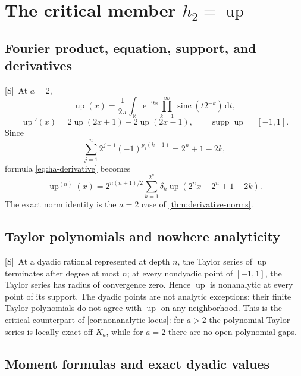 \documentclass[11pt,oneside]{article}
\theoremstyle{definition}
\theoremstyle{remark}
\newcommand{\R}{\mathbb R}
\newcommand{\Up}{\operatorname{up}}
\newcommand{\sinc}{\operatorname{sinc}}
\newcommand{\e}{\mathrm e}
\newcommand{\ii}{\mathrm i}
\newcommand{\dd}{\,\mathrm d}
\newcommand{\supp}{\operatorname{supp}}
\newcommand{\Smark}{\textcolor{sourceblue}{\textsf{[S]}}}
\begin{document}
\section{The critical member $h_2=\Up$}
\label{sec:up}

\subsection{Fourier product, equation, support, and derivatives}

\Smark\ At $a=2$,
\begin{equation}
 \Up(x)=\frac1{2\pi}\int_{\R}\e^{-\ii tx}
 \prod_{k=1}^{\infty}\sinc(t2^{-k})\dd t,
 \tag{S3.60}
 \label{eq:up-product}
\end{equation}
\begin{equation}
 \Up'(x)=2\Up(2x+1)-2\Up(2x-1),
 \qquad \supp\Up=[-1,1].
 \tag{S3.61--S3.62}
 \label{eq:up-equation}
\end{equation}
Since
\[
 \sum_{j=1}^{n}2^{j-1}(-1)^{p_j(k-1)}=2^n+1-2k,
\]
formula \eqref{eq:ha-derivative} becomes
\begin{equation}
 \Up^{(n)}(x)=2^{n(n+1)/2}
 \sum_{k=1}^{2^n}\delta_k\Up(2^nx+2^n+1-2k).
 \tag{S3.63}
 \label{eq:up-derivative}
\end{equation}
The exact norm identity is the $a=2$ case of \cref{thm:derivative-norms}.

\subsection{Taylor polynomials and nowhere analyticity}

\Smark\ At a dyadic rational represented at depth $n$, the Taylor series of $\Up$
terminates after degree at most $n$; at every nondyadic point of $[-1,1]$, the Taylor series has
radius of convergence zero.
Hence $\Up$ is nonanalytic at every point of its support.  The dyadic points are not analytic
exceptions: their finite Taylor polynomials do not agree with $\Up$ on any neighborhood.
This is the critical counterpart of \cref{cor:nonanalytic-locus}: for $a>2$ the polynomial
Taylor series is locally exact off $K_a$, while for $a=2$ there are no open polynomial gaps.

\subsection{Moment formulas and exact dyadic values}
\end{document}
